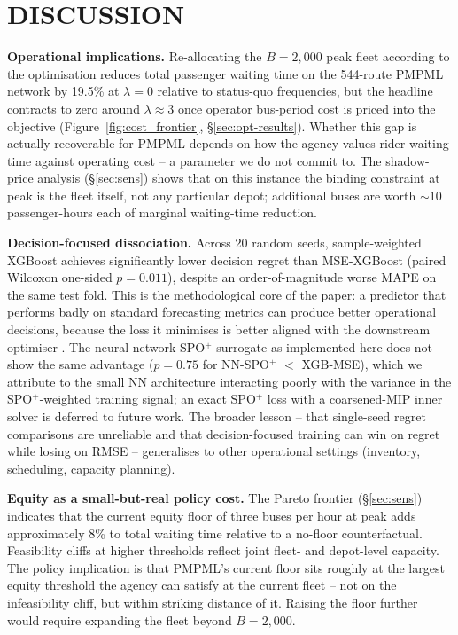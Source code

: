\documentclass[a4paper,twoside]{article}
\begin{document}
\section{\uppercase{Discussion}}
\label{sec:discussion}

\textbf{Operational implications.} Re-allocating the
$B = 2{,}000$ peak fleet according to the optimisation reduces
total passenger waiting time on the 544-route PMPML network by
19.5\% at $\lambda = 0$ relative to status-quo frequencies, but
the headline contracts to zero around $\lambda \approx 3$ once
operator bus-period cost is priced into the objective
(Figure~\ref{fig:cost_frontier}, \S\ref{sec:opt-results}).
Whether this gap is actually recoverable for PMPML depends on
how the agency values rider waiting time against operating cost
-- a parameter we do not commit to. The shadow-price analysis
(\S\ref{sec:sens}) shows that on this instance the binding
constraint at peak is the fleet itself, not any particular
depot; additional buses are worth $\sim 10$ passenger-hours each
of marginal waiting-time reduction.

\textbf{Decision-focused dissociation.} Across 20 random seeds,
sample-weighted XGBoost achieves significantly lower decision
regret than MSE-XGBoost (paired Wilcoxon one-sided $p = 0.011$),
despite an order-of-magnitude worse MAPE on the same test fold.
This is the methodological core of the paper: a predictor that
performs badly on standard forecasting metrics can produce
better operational decisions, because the loss it minimises is
better aligned with the downstream optimiser
\cite{elmachtoub2022smart}. The neural-network SPO$^+$ surrogate
as implemented here does not show the same advantage
($p = 0.75$ for NN-SPO$^+$ $<$ XGB-MSE), which we attribute to
the small NN architecture interacting poorly with the variance
in the SPO$^+$-weighted training signal; an exact SPO$^+$ loss
with a coarsened-MIP inner solver is deferred to future work.
The broader lesson -- that single-seed regret comparisons are
unreliable and that decision-focused training can win on regret
while losing on RMSE -- generalises to other operational settings
(inventory, scheduling, capacity planning).

\textbf{Equity as a small-but-real policy cost.} The Pareto
frontier (\S\ref{sec:sens}) indicates that the current equity
floor of three buses per hour at peak adds approximately 8\% to
total waiting time relative to a no-floor counterfactual.
Feasibility cliffs at higher thresholds reflect joint fleet- and
depot-level capacity. The policy implication is that PMPML's
current floor sits roughly at the largest equity threshold the
agency can satisfy at the current fleet -- not on the
infeasibility cliff, but within striking distance of it. Raising
the floor further would require expanding the fleet beyond
$B = 2{,}000$.
\end{document}
